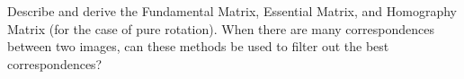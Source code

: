 Describe and derive the Fundamental Matrix, Essential Matrix, and Homography Matrix (for the case of pure rotation). When there are many correspondences between two images, can these methods be used to filter out the best correspondences?
